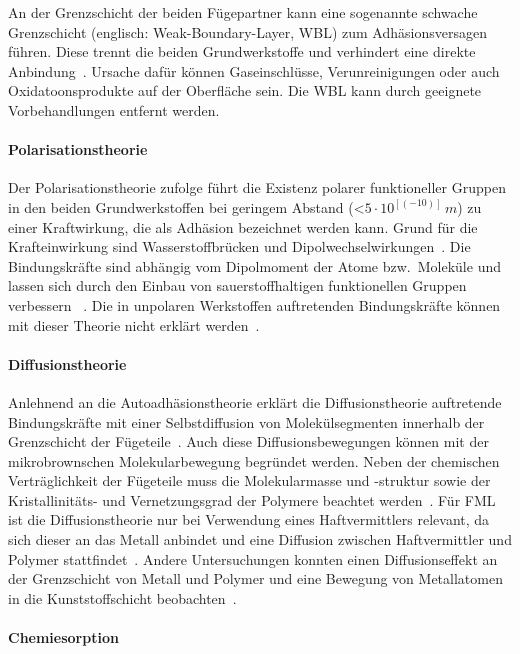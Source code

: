 An der Grenzschicht der beiden Fügepartner kann eine sogenannte schwache Grenzschicht (englisch: Weak-Boundary-Layer, WBL) zum Adhäsionsversagen führen.
Diese trennt die beiden Grundwerkstoffe und verhindert eine direkte Anbindung~\cite{Schroer.1994}.
Ursache dafür können Gaseinschlüsse, Verunreinigungen oder auch Oxidatoonsprodukte auf der Oberfläche sein.
Die WBL kann durch geeignete Vorbehandlungen entfernt werden\cite{Flock.b}.

\paragraph{Polarisationstheorie}

Der Polarisationstheorie zufolge führt die Existenz polarer funktioneller Gruppen in den beiden Grundwerkstoffen bei geringem Abstand (<$5\cdot10^[(-10)] \, m$) zu einer Kraftwirkung, die als Adhäsion bezeichnet werden kann.
Grund für die Krafteinwirkung sind Wasserstoffbrücken und Dipolwechselwirkungen~\cite{Weiss.2002}.
Die Bindungskräfte sind abhängig vom Dipolmoment der Atome bzw.\ Moleküle und lassen sich durch den Einbau von sauerstoffhaltigen funktionellen Gruppen verbessern \cite{Garbassi.1998}~.
Die in unpolaren Werkstoffen auftretenden Bindungskräfte können mit dieser Theorie nicht erklärt werden~\cite{Habenicht.2009}.

\paragraph{Diffusionstheorie}

Anlehnend an die Autoadhäsionstheorie erklärt die Diffusionstheorie auftretende Bindungskräfte mit einer Selbstdiffusion von Molekülsegmenten innerhalb der Grenzschicht der Fügeteile~\cite{Gromov.1963}.
Auch diese Diffusionsbewegungen können mit der mikrobrownschen Molekularbewegung begründet werden.
Neben der chemischen Verträglichkeit der Fügeteile muss die Molekularmasse und -struktur sowie der Kristallinitäts- und Vernetzungsgrad der Polymere beachtet werden~\cite{Habenicht.2009}.
Für FML ist die Diffusionstheorie nur bei Verwendung eines Haftvermittlers relevant,  da sich dieser an das Metall anbindet und eine Diffusion zwischen Haftvermittler und Polymer stattfindet~\cite{Suchentrunk.2007}.
Andere Untersuchungen konnten einen Diffusionseffekt an der Grenzschicht von Metall und Polymer und eine Bewegung von Metallatomen in die Kunststoffschicht beobachten~\cite{Faupel.2003}.

\paragraph{Chemiesorption}


